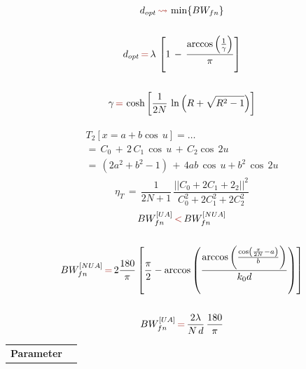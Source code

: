 \documentclass[12pt,a4paper]{article}
\begin{document}
{\begin{multicols}{2}
{\begin{equation}
\begin{gathered}
d_{opt}\,{\color{Mahogany}\leadsto}\,\min\{BW_{fn}\}\\
\\
d_{opt}\,{\color{Mahogany}=}\,\lambda\,\left[1\,-\,\frac{\arccos\left(\frac{1}{\gamma}\right)}{\pi}\right]\\
\\
\gamma\,{\color{Mahogany}=}\,\cosh\left[\frac{1}{2N}\,\ln\left(R+\sqrt{R^2-1}\right)\right]
\end{gathered}
\label{eq:test}
\end{equation}
}

\begin{equation}\begin{split}
		\begin{aligned}
T_2\left[x=a+b\cos\,u\right]=\dots\\
=\,C_0\,+\,2\,C_1\,\cos\,u\,+\,C_2\cos\,2u\\
=\,(2a^2+b^2-1)\,+\,4ab\,\cos\,u+b^2\,\cos\,2u
\label{eq:tcheby poly coeff}
\end{aligned}
\end{split}
\end{equation}
\begin{equation}
\eta_T\,=\,\frac{1}{2N+1}\,\frac{||C_0+2C_1+2_2||^2}{C_0^2+2C_1^2+2C_2^2}
\label{eq:tapering efficiency}
\end{equation}
\begin{equation}
\begin{gathered}
BW_{fn}^{[UA]}\,{\color{Mahogany}<}\,BW_{fn}^{[NUA]}\\
\\
BW_{fn}^{[NUA]}\,{\color{Mahogany}=}\,2\frac{180}{\pi}\left[\frac{\pi}{2}-\arccos\left(\frac{\arccos\left(\frac{\cos\left(\frac{\pi}{2N}-a\right)}{b}\right)}{k_0d}\right)\right]\\
\\
BW_{fn}^{[UA]}\,{\color{Mahogany}=}\,\frac{2\lambda}{N\,d}\,\frac{180}{\pi}
\end{gathered}
\label{eq:tcheby beamwidth}
\end{equation}
\end{multicols}
\begin{table}[bt!] 
\begin{center}
		{\selectfont
\begin{tabular}{||m{6cm}|m{6cm}||}
\hline
\textbf{\color{Mahogany}Parameter}


\end{tabular}}
\end{center}
\end{table}}
\end{document}
